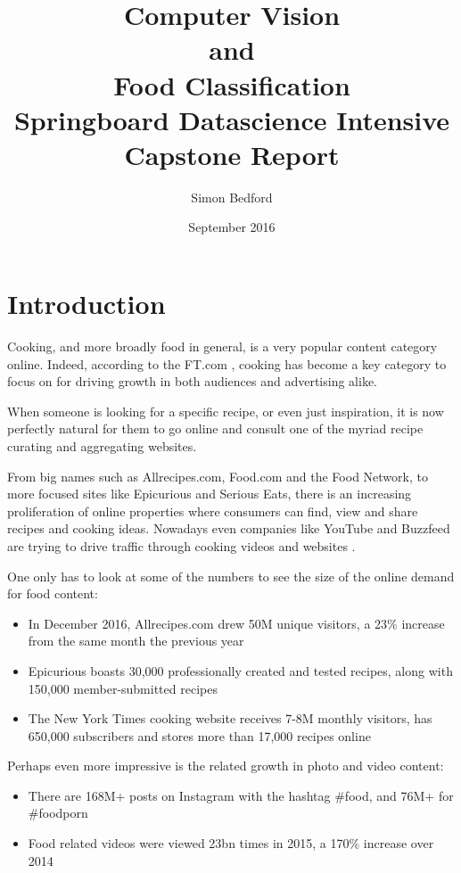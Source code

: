 \documentclass[10pt,a4paper]{article}
\title{
	{
	\TitleFont Computer Vision \protect\\ and \\ Food Classification \\[2cm] Springboard Datascience Intensive \\ Capstone Report
	}\\
}
\author{\TitleSubFont Simon Bedford}
\date{\TitleSubFont September 2016}
\begin{document}
\maketitle

\newpage

\tableofcontents

\section{Introduction}

Cooking, and more broadly food in general, is a very popular content category online. Indeed, according to the FT.com \cite{ft}, cooking has become a key category to focus on for driving growth in both audiences and advertising alike.

When someone is looking for a specific recipe, or even just inspiration, it is now perfectly natural for them to go online and consult one of the myriad recipe curating and aggregating websites.

From big names such as Allrecipes.com, Food.com and the Food Network, to more focused sites like Epicurious and Serious Eats, there is an increasing proliferation of online properties where consumers can find, view and share recipes and cooking ideas. Nowadays even companies like YouTube and Buzzfeed are trying to drive traffic through cooking videos and websites \cite{ft}.

One only has to look at some of the numbers to see the size of the online demand for food content:

\begin{itemize}
\item In December 2016, Allrecipes.com drew 50M unique visitors, a 23\% increase from the same month the previous year \cite{ft}
\item Epicurious boasts 30,000 professionally created and tested recipes, along with 150,000 member-submitted recipes \cite{epicurious}
\item The New York Times cooking website receives 7-8M monthly visitors, has 650,000 subscribers and stores more than 17,000 recipes online \cite{ft}
\end{itemize}

Perhaps even more impressive is the related growth in photo and video content:

\begin{itemize}
\item There are 168M+ posts on Instagram with the hashtag \#food, and 76M+ for \#foodporn \cite{bizcom}
\item Food related videos were viewed 23bn times in 2015, a 170\% increase over 2014 \cite{ft}
\end{itemize}
\end{document}
